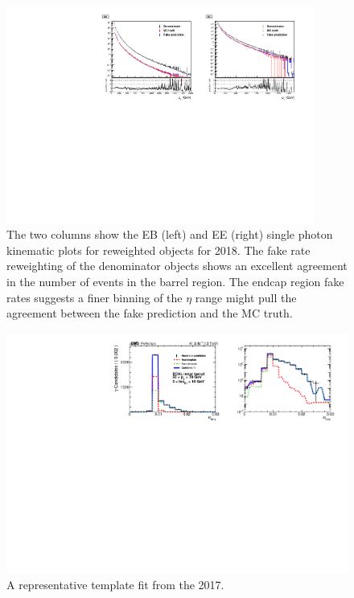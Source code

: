 \begin{figure}[!htbp]
\includegraphics[width=0.9\textwidth]{fig/closure_test_photon_kinematics_pt_2018.pdf}
\caption{The two columns show the EB (left) and EE (right) single photon kinematic plots for reweighted objects for 2018. The fake rate reweighting of the denominator objects shows an excellent agreement in the number of events in the barrel region. The endcap region fake rates suggests a finer binning of the $\eta$ range might pull the agreement between the fake prediction and the MC truth.}
\label{fig:kinematics18}
\end{figure}



\begin{figure}[!htbp]
\centering
\includegraphics[scale=0.85]{fig/fakeRatePlot_all_2017_EB1_pT50To70_chIso5To10.pdf}
\caption{A representative template fit from the 2017.}
\label{fig:templatefit_2017_etabinned}
\end{figure}

